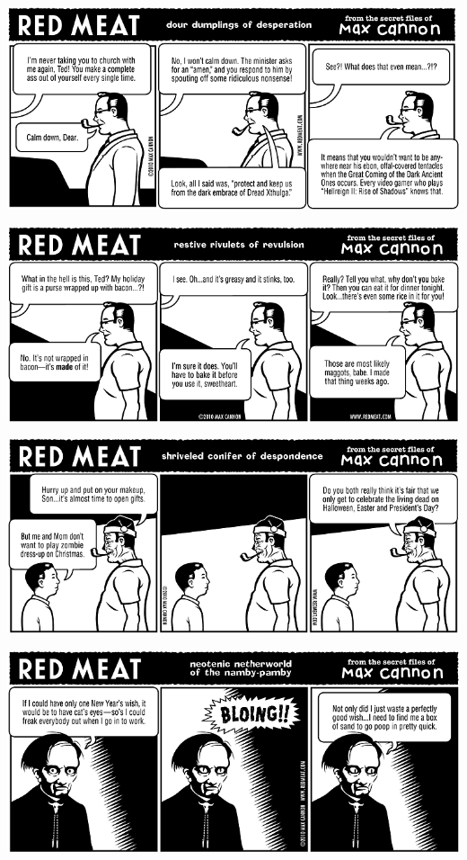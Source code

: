 \documentclass[a4paper,twoside,11pt]{article}
\begin{document}
\includegraphics[width=\textwidth]{redmeat_2010-12-14.png}



\includegraphics[width=\textwidth]{redmeat_2010-12-21.png}



\includegraphics[width=\textwidth]{redmeat_2010-12-28.png}



\includegraphics[width=\textwidth]{redmeat_2011-01-04.png}
\end{document}
